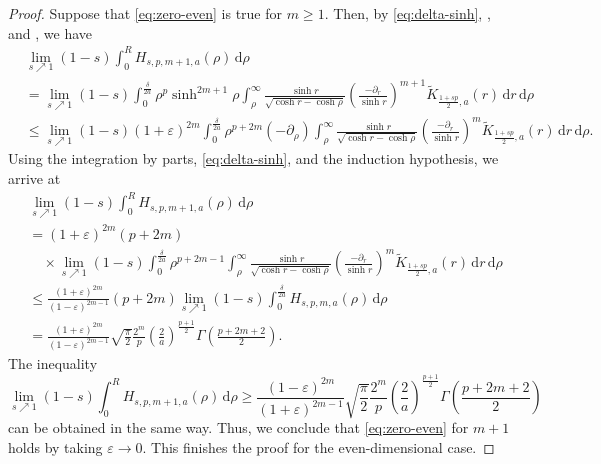 \documentclass[11pt]{amsart}
\theoremstyle{plain}
\theoremstyle{definition}
\numberwithin{equation}{section}
\begin{document}
\begin{proof}
Suppose that \eqref{eq:zero-even} is true for $m \geq 1$. Then, by \eqref{eq:delta-sinh}, , and , we have
\begin{equation*}
\begin{split}
&\lim_{s \nearrow 1} (1-s) \int_{0}^{R} H_{s, p, m+1, a}(\rho) \, \mathrm{d}\rho \\
&= \lim_{s \nearrow 1} (1-s) \int_{0}^{\frac{\delta}{2a}} \rho^{p} \sinh^{2m+1}\rho \int_{\rho}^{\infty} \frac{\sinh r}{\sqrt{\cosh r - \cosh \rho}} \left( \frac{-\partial_{r}}{\sinh r} \right)^{m+1} \widetilde{K}_{\frac{1+sp}{2},a}(r) \, \mathrm{d}r \, \mathrm{d}\rho \\
&\leq \lim_{s \nearrow 1} (1-s) (1+\varepsilon)^{2m} \int_{0}^{\frac{\delta}{2a}} \rho^{p+2m} (-\partial_{\rho}) \int_{\rho}^{\infty} \frac{\sinh r}{\sqrt{\cosh r - \cosh \rho}} \left( \frac{-\partial_{r}}{\sinh r} \right)^{m} \widetilde{K}_{\frac{1+sp}{2},a}(r) \, \mathrm{d}r \, \mathrm{d}\rho.
\end{split}
\end{equation*}
Using the integration by parts, \eqref{eq:delta-sinh}, and the induction hypothesis, we arrive at
\begin{equation*}
\begin{split}
&\lim_{s \nearrow 1} (1-s) \int_{0}^{R} H_{s, p, m+1, a}(\rho) \, \mathrm{d}\rho \\
&= (1+\varepsilon)^{2m} (p+2m) \\
&\quad\times \lim_{s \nearrow 1} (1-s) \int_{0}^{\frac{\delta}{2a}} \rho^{p+2m-1} \int_{\rho}^{\infty} \frac{\sinh r}{\sqrt{\cosh r - \cosh \rho}} \left( \frac{-\partial_{r}}{\sinh r} \right)^{m} \widetilde{K}_{\frac{1+sp}{2},a}(r) \, \mathrm{d}r \, \mathrm{d}\rho \\
&\leq \frac{(1+\varepsilon)^{2m}}{(1-\varepsilon)^{2m-1}} (p+2m) \lim_{s \nearrow 1} (1-s) \int_{0}^{\frac{\delta}{2a}} H_{s, p, m, a}(\rho) \, \mathrm{d}\rho \\
&= \frac{(1+\varepsilon)^{2m}}{(1-\varepsilon)^{2m-1}} \sqrt{\frac{\pi}{2}} \frac{2^{m}}{p} \left( \frac{2}{a} \right)^{\frac{p+1}{2}} \Gamma\left(\frac{p+2m+2}{2} \right).
\end{split}
\end{equation*}
The inequality
\begin{equation*}
\lim_{s \nearrow 1} (1-s) \int_{0}^{R} H_{s, p, m+1, a}(\rho) \, \mathrm{d}\rho \geq \frac{(1-\varepsilon)^{2m}}{(1+\varepsilon)^{2m-1}} \sqrt{\frac{\pi}{2}} \frac{2^{m}}{p} \left( \frac{2}{a} \right)^{\frac{p+1}{2}} \Gamma\left( \frac{p+2m+2}{2} \right)
\end{equation*}
can be obtained in the same way. Thus, we conclude that \eqref{eq:zero-even} for $m+1$ holds by taking $\varepsilon \to 0$. This finishes the proof for the even-dimensional case.
\end{proof}
\end{document}
